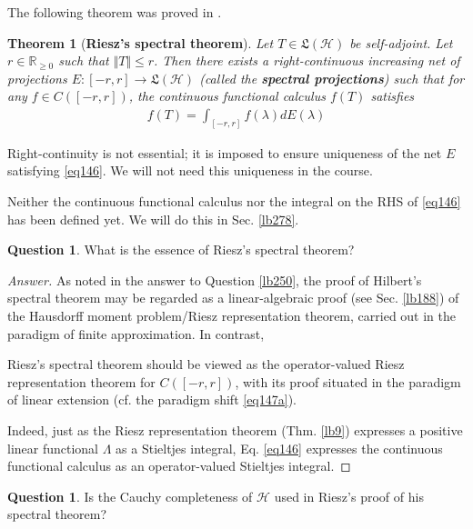 \documentclass[12pt,b5paper,notitlepage]{article}
\theoremstyle{definition}
\newtheorem{question}[df]{Question}
\theoremstyle{plain}
\newtheorem{thm}[df]{Theorem}
\newcommand{\fk}{\mathfrak}
\newcommand{\Rbb}{\mathbb R}
\newcommand{\MH}{\mathcal H}
\numberwithin{equation}{section}
\begin{document}
The following theorem was proved in \cite[Ch. V, Sec. 94]{Rie13}.


\begin{thm}[\textbf{Riesz's spectral theorem}]\label{lb267}
Let $T\in\fk L(\MH)$ be self-adjoint. Let $r\in\Rbb_{\geq0}$ such that $\Vert T\Vert\leq r$. Then there exists a right-continuous increasing net of projections $E:[-r,r]\rightarrow\fk L(\MH)$ (called the \textbf{spectral projections})  such that for any $f\in C([-r,r])$, the continuous functional calculus $f(T)$ satisfies
\begin{align}\label{eq146}
f(T)=\int_{[-r,r]}f(\lambda)dE(\lambda)
\end{align}
\end{thm}

Right-continuity is not essential; it is imposed to ensure uniqueness of the net $E$ satisfying \eqref{eq146}. We will not need this uniqueness in the course.


Neither the continuous functional calculus nor the integral on the RHS of \eqref{eq146} has been defined yet. We will do this in Sec. \ref{lb278}.

\begin{question}\label{lb271}
What is the essence of Riesz's spectral theorem?
\end{question}


\begin{proof}[Answer]
As noted in the answer to Question \ref{lb250}, the proof of Hilbert's spectral theorem may be regarded as a linear-algebraic proof (see Sec. \ref{lb188}) of the Hausdorff moment problem/Riesz representation theorem, carried out in the paradigm of finite approximation. In contrast,
\begin{tcolorbox}
Riesz's spectral theorem should be viewed as the operator-valued Riesz representation theorem for $C([-r,r])$, with its proof situated in the paradigm of linear extension (cf. the paradigm shift \eqref{eq147a}).
\end{tcolorbox}
Indeed, just as the Riesz representation theorem (Thm. \ref{lb9}) expresses a positive linear functional $\Lambda$ as a Stieltjes integral, Eq. \eqref{eq146} expresses the continuous functional calculus as an operator-valued Stieltjes integral.
\end{proof}


\begin{question}\label{lb270}
Is the Cauchy completeness of $\MH$ used in Riesz's proof of his spectral theorem?
\end{question}
\end{document}
